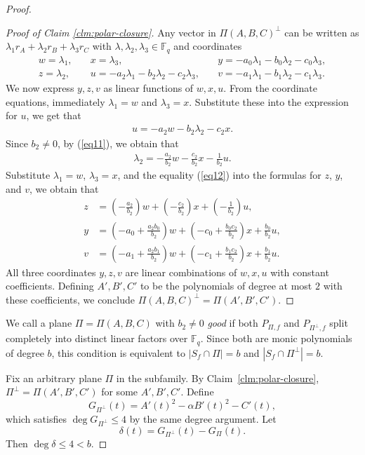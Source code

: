 \documentclass[11pt,a4paper]{article}
\theoremstyle{definition}
\theoremstyle{remark}
\begin{document}
\begin{proof}
\begin{proof}[Proof of Claim \ref{clm:polar-closure}]
Any vector in $\Pi(A,B,C)^\perp$ can be written as $\lambda_1 r_A + \lambda_2 r_B + \lambda_3 r_C$ with $\lambda,\lambda_2,\lambda_3 \in \mathbb{F}_q$ and coordinates
\[
\begin{array}{lll}
w = \lambda_1, &\quad x = \lambda_3, &\quad y = -a_0\lambda_1 - b_0\lambda_2 - c_0\lambda_3, \\
z = \lambda_2, &\quad u = -a_2\lambda_1 - b_2\lambda_2 - c_2\lambda_3, &\quad v = -a_1\lambda_1 - b_1\lambda_2- c_1\lambda_3.
\end{array}
\]
We now express $y,z,v$ as linear functions of $w,x,u$. From the coordinate equations, immediately $\lambda_1 = w$ and $\lambda_3 = x$. 
Substitute these into the expression for $u$, we get that 
\begin{align}\label{eq11}
u = -a_2 w - b_2 \lambda_2 - c_2 x.
\end{align}
Since $b_2 \neq 0$, by (\ref{eq11}), we obtain that 
\begin{align}\label{eq12}
\lambda_2 = -\frac{a_2}{b_2} w - \frac{c_2}{b_2} x - \frac{1}{b_2} u.
\end{align}
Substitute $\lambda_1=w$, $\lambda_3=x$, and the equality (\ref{eq12}) into the formulas for $z$, $y$, and $v$, we obtain that
\[
\begin{aligned}
z &= \left(-\frac{a_2}{b_2}\right) w + \left(-\frac{c_2}{b_2}\right) x + \left(-\frac{1}{b_2}\right) u, \\
y&= \left(-a_0 + \frac{a_2 b_0}{b_2}\right) w
+ \left(-c_0 + \frac{b_0 c_2}{b_2}\right) x
+ \frac{b_0}{b_2} u, \\
v&= \left(-a_1 + \frac{a_2 b_1}{b_2}\right) w
+ \left(-c_1 + \frac{b_1 c_2}{b_2}\right) x
+ \frac{b_1}{b_2} u.
\end{aligned}
\]
All three coordinates $y,z,v$ are linear combinations of $w,x,u$ with constant coefficients. Defining $A',B',C'$ to be the  polynomials of degree at most $2$ with these coefficients, we conclude $\Pi(A,B,C)^\perp = \Pi(A',B',C')$.
\end{proof}


We call a plane $\Pi = \Pi(A,B,C)$ with $b_2 \neq 0$ \emph{good} if both $P_{\Pi,f}$ and $P_{\Pi^\perp,f}$ split completely into distinct linear factors over $\mathbb{F}_q$. Since both are monic polynomials of degree $b$, this condition is equivalent to $|S_f \cap \Pi| = b$ and $|S_f \cap \Pi^\perp| = b$.

Fix an arbitrary plane $\Pi$ in the subfamily. By Claim~\ref{clm:polar-closure}, $\Pi^\perp = \Pi(A',B',C')$ for some $A',B',C'$. Define
\[
G_{\Pi^\perp}(t) = A'(t)^2 - \alpha B'(t)^2 - C'(t),
\]
which satisfies $\deg G_{\Pi^\perp} \leq 4$ by the same degree argument. Let
\[
\delta(t) = G_{\Pi^\perp}(t) - G_\Pi(t).
\]
Then $\deg \delta \leq 4 < b$.


\end{proof}
\end{document}

